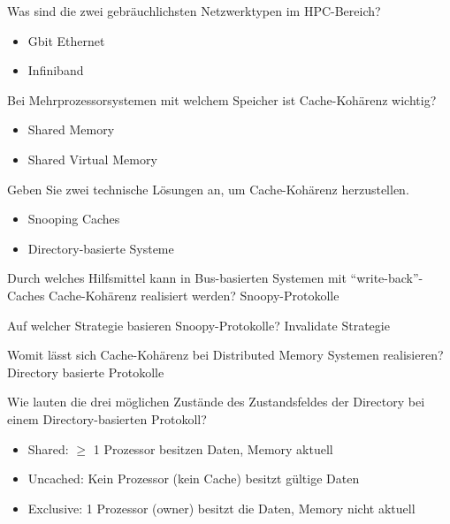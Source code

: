 {
    Was sind die zwei gebräuchlichsten Netzwerktypen im HPC-Bereich?
}
{
    \begin{itemize}
        \item Gbit Ethernet
        \item Infiniband
    \end{itemize}
}

{
    Bei Mehrprozessorsystemen mit welchem Speicher ist Cache-Kohärenz wichtig?
}
{
    \begin{itemize}
        \item Shared Memory
        \item Shared Virtual Memory
    \end{itemize}
}

{
    Geben Sie zwei technische Lösungen an, um Cache-Kohärenz herzustellen.
}
{
    \begin{itemize}
        \item Snooping Caches
        \item Directory-basierte Systeme
    \end{itemize}
}

{
    Durch welches Hilfsmittel kann in Bus-basierten Systemen mit \enquote{write-back}-Caches Cache-Kohärenz realisiert werden?
}
{
    Snoopy-Protokolle
}

{
    Auf welcher Strategie basieren Snoopy-Protokolle?
}
{
    Invalidate Strategie
}

{
    Womit lässt sich Cache-Kohärenz bei Distributed Memory Systemen realisieren?
}
{
    Directory basierte Protokolle
}

{
    Wie lauten die drei möglichen Zustände des Zustandsfeldes der Directory bei einem Directory-basierten Protokoll?
}
{
    \begin{itemize}
        \item Shared: $\geq$ 1 Prozessor besitzen Daten, Memory aktuell
        \item Uncached: Kein Prozessor (kein Cache) besitzt gültige Daten
        \item Exclusive: 1 Prozessor (owner) besitzt die Daten, Memory nicht aktuell
    \end{itemize}
}

